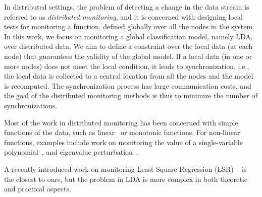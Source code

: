 \documentclass{sig-alternate-05-2015}
\begin{document}

In distributed settings, the problem of detecting a change in the data stream is referred to as {\em distributed monitoring}, and it is concerned with designing local tests for monitoring a function, defined globally over all the nodes in the system.
In this work, we focus on monitoring a global classification model, namely LDA, over distributed data.
We aim to define a constraint over the local data (at each node) that guarantees the validity of the global model. If a local data (in one or more nodes) does not meet the local condition, it leads to synchronization, i.e., the local data is collected to a central location from all the nodes and the model is recomputed.
The synchronization process has large communication costs, and the goal of the distributed monitoring methods is thus to minimize the number of synchronizations.

Most of the work in distributed monitoring has been concerned with simple
functions of the data, such as
linear~\cite{keralapura2006communication, kashyap2008efficient} or
monotonic \cite{michel2005klee} functions.
For non-linear functions, examples include work on monitoring the value
of a single-variable polynomial~\cite{shah2008handling},
and eigenvalue perturbation~\cite{huang2007communication}.

A recently introduced work on monitoring Least Square
Regression (LSR) ~\cite{gabel2015monitoring} is the closest to ours, but the problem in LDA is more complex in both theoretic and practical aspects.
\end{document}
